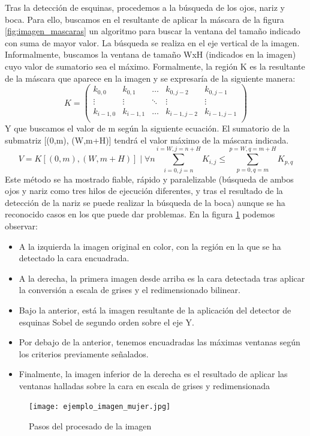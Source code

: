 Tras la detección de esquinas, procedemos a la búsqueda de los ojos, nariz y boca. Para ello, buscamos en el resultante de aplicar la máscara de la figura \ref{fig:imagen_mascaras} un algoritmo para buscar la ventana del tamaño indicado con suma de mayor valor. La búsqueda se realiza en el eje vertical de la imagen. Informalmente, buscamos la ventana de tamaño WxH (indicados en la imagen) cuyo valor de sumatorio sea el máximo. Formalmente, la región K es la resultante de la máscara que aparece en la imagen y se expresaría de la siguiente manera:
\[
 K = \left( 
	\begin{array}{lcccr} 
		k_{0,0} & k_{0,1} & \hdots & k_{0,j-2} & k_{0,j-1} \\
		\vdots & \vdots & \ddots & \vdots & \vdots \\
		k_{i-1,0} & k_{i-1,1} & \hdots & k_{i-1,j-2} & k_{i-1,j-1} \\
	\end{array} \right)
\]
Y que buscamos el valor de m según la siguiente ecuación. El sumatorio de la submatriz [(0,m), (W,m+H)] tendrá el valor máximo de la máscara indicada.
\[
   V = K\left[\left(0,m\right), \left(W,m+H\right) \right] \mid \forall n \sum_{i=0,j=n}^{i=W,j=n+H} K_{i,j} \leq \sum_{p=0,q=m}^{p=W,q=m+H} K_{p,q} 
\]
Este método se ha mostrado fiable, rápido y paralelizable (búsqueda de ambos ojos y nariz como tres hilos de ejecución diferentes, y tras el resultado de la detección de la nariz se puede realizar la búsqueda de la boca) aunque se ha reconocido casos en los que puede dar problemas. En la figura \ref{fig:imagenes_procesadas} podemos observar:
\begin{itemize}
	\item{A la izquierda la imagen original en color, con la región en la que se ha detectado la cara encuadrada.}
	\item{A la derecha, la primera imagen desde arriba es la cara detectada tras aplicar la conversión a escala de grises y el redimensionado bilinear.}
	\item{Bajo la anterior, está la imagen resultante de la aplicación del detector de esquinas Sobel de segundo orden sobre el eje Y.}
	\item{Por debajo de la anterior, tenemos encuadradas las máximas ventanas según los criterios previamente señalados.}
	\item{Finalmente, la imagen inferior de la derecha es el resultado de aplicar las ventanas halladas sobre la cara en escala de grises y redimensionada}
\end{itemize}
\begin{figure}[h!]
	\centering
	\texttt{[image: ejemplo\_imagen\_mujer.jpg]}
	\caption{Pasos del procesado de la imagen}
	\label{fig:imagenes_procesadas}
\end{figure}

